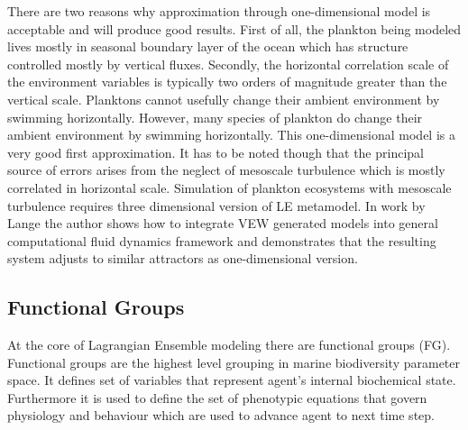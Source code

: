 \documentclass[12pt, a4paper]{report}
\begin{document}
There are two reasons why approximation through one-dimensional model is
acceptable and will produce good results. First of all, the plankton being
modeled lives mostly in seasonal boundary layer of the ocean which has structure
controlled mostly by vertical fluxes. Secondly, the horizontal correlation
scale of the environment variables is typically two orders of magnitude greater
than the vertical scale. Planktons cannot usefully change their ambient environment
by swimming horizontally. However, many species of plankton do change their
ambient environment by swimming horizontally. This one-dimensional model is a very
good first approximation. It has to be noted though that the principal source
of errors arises from the neglect of mesoscale turbulence which is mostly correlated
in horizontal scale. Simulation of plankton ecosystems with mesoscale turbulence
requires three dimensional version of LE metamodel. In work by Lange \cite{FluidityVEW}
the author shows how to integrate VEW generated models into general computational
fluid dynamics framework and demonstrates that the resulting system adjusts to
similar attractors as one-dimensional version.

\subsection{Functional Groups}\label{subsec:fg}

At the core of Lagrangian Ensemble modeling there are functional groups (FG).
Functional groups are the highest level grouping in marine biodiversity
parameter space. It defines set of variables that represent agent's internal
biochemical state. Furthermore it is used to define the set of phenotypic
equations that govern physiology and behaviour which are used to advance
agent to next time step.
\end{document}

